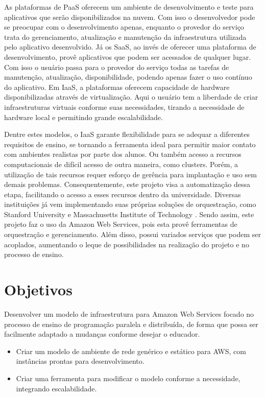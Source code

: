 \documentclass[tg]{mdtufsm}
\begin{document}
As plataformas de PaaS oferecem um ambiente de desenvolvimento e teste para aplicativos que serão disponibilizados na nuvem. Com isso o desenvolvedor pode se preocupar com o desenvolvimento apenas, enquanto o provedor do serviço trata do gerenciamento, atualização e manutenção da infraestrutura utilizada pelo aplicativo desenvolvido. Já os SaaS, ao invés de oferecer uma plataforma de desenvolvimento, provê aplicativos que podem ser acessados de qualquer lugar. Com isso o usuário passa para o provedor do serviço todas as tarefas de manutenção, atualização, disponibilidade, podendo apenas fazer o uso contínuo do aplicativo. Em IaaS, a plataformas oferecem capacidade de hardware disponibilizadas através de virtualização. Aqui o usuário tem a liberdade de criar infraestruturas virtuais conforme suas necessidades, tirando a necessidade de hardware local e permitindo grande escalabilidade.

Dentre estes modelos, o IaaS garante flexibilidade para se adequar a diferentes requisitos de ensino, se tornando a ferramenta ideal para permitir maior contato com ambientes realistas por parte dos alunos. Ou também acesso a recursos computacionais de difícil acesso de outra maneira, como clusters. Porém, a utilização de tais recursos requer esforço de gerência para implantação e uso sem demais problemas. Consequentemente, este projeto visa a automatização dessa etapa, facilitando o acesso a esses recursos dentro da universidade. Diversas instituições já vem implementando suas próprias soluções de orquestração, como Stanford University e Massachusetts Institute of Technology \cite{stanford}. Sendo assim, este projeto faz o uso da Amazon Web Services, pois esta provê ferramentas de orquestração e gerenciamento. Além disso, possui variados serviços que podem ser acoplados, aumentando o leque de possibilidades na realização do projeto e no processo de ensino.

\section{Objetivos}

Desenvolver um modelo de infraestrutura para Amazon Web Services focado no processo de ensino de programação paralela e distribuída, de forma que possa ser facilmente adaptado a mudanças conforme desejar o educador.

\begin{itemize}
\item Criar um modelo de ambiente de rede genérico e estático para AWS, com instâncias prontas para desenvolvimento.
\item Criar uma ferramenta para modificar o modelo conforme a necessidade, integrando escalabilidade.
\end{itemize}
\end{document}

